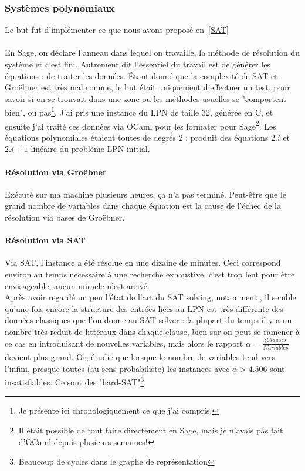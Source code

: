 \documentclass{article}		%
\theoremstyle{definition}
\theoremstyle{plain}
\theoremstyle{plain}
\theoremstyle{plain}
\theoremstyle{plain}
\theoremstyle{plain}
\begin{document}
\subsubsection{Systèmes polynomiaux}\label{ISAT}
Le but fut d'implémenter ce que nous avons proposé en~\ref{SAT}
\\\\
En Sage, on déclare l'anneau dans lequel on travaille, la méthode de
résolution du système et c'est fini. Autrement dit l'essentiel du travail
est de générer les équations : de traiter les données. Étant donné que la
complexité de SAT et Groëbner est très mal connue, le but était
uniquement d'effectuer un test, pour savoir si on se trouvait dans une
zone ou les méthodes usuelles se "comportent bien", ou pas\footnote{Je
présente ici chronologiquement ce que j'ai compris.}.
J'ai pris une instance du LPN de taille 32, générée en C, et ensuite j'ai
traité ces données via OCaml pour les formater pour Sage\footnote{Il
était possible de tout faire directement en Sage, mais je n'avais pas
fait d'OCaml depuis plusieurs semaines!}. Les équations polynomiales
étaient toutes de degrés 2 : produit des équations $2.i$ et $2.i+1$
linéaire du problème LPN initial.
\paragraph{Résolution via Groëbner}
Exécuté sur ma machine plusieurs heures, ça n'a pas terminé. Peut-être 
que le grand nombre de variables dans chaque équation est la cause de
l'échec de la résolution via
bases de Groëbner.
\paragraph{Résolution via SAT}
Via SAT, l'instance a été résolue en une dizaine de minutes. Ceci
correspond environ au temps necessaire à une recherche exhaustive, c'est
trop lent pour être envisageable, aucun miracle n'est arrivé. 
\\
Après avoir regardé
un peu l'état de l'art du SAT solving, notamment \cite{Mezard}, il semble qu'une fois encore la
structure des entrées liées au LPN est très différente des données
classiques que l'on donne au SAT solver : la plupart du temps il y a un
nombre très réduit de littéraux dans chaque clause, bien sur on peut se
ramener à ce cas en introduisant de nouvelles variables, mais alors le
rapport $\alpha=\frac {\sharp Clauses}{\sharp Variables}$ devient plus grand.
Or, \cite{Dubois} étudie que lorsque le nombre de variables tend vers
l'infini, presque toutes (au sens probabiliste) les
instances avec $\alpha > 4.506$ sont insatisfiables. Ce sont des
"hard-SAT"\footnote{Beaucoup de cycles dans le graphe de représentation}.
\end{document}
